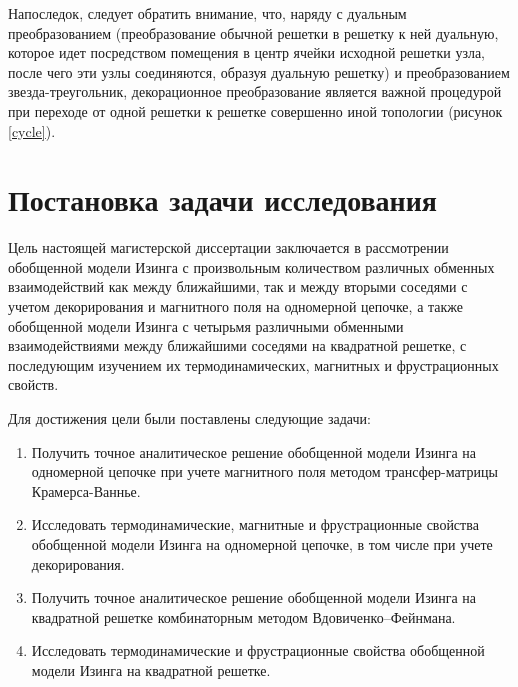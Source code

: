 Напоследок, следует обратить внимание, что, наряду с дуальным преобразованием (преобразование обычной решетки в решетку к ней дуальную, которое идет посредством помещения в центр ячейки исходной решетки узла, после чего эти узлы соединяются, образуя дуальную решетку) и преобразованием \guillemotleft звезда-треугольник\guillemotright \hspace{1pt}, декорационное преобразование является важной процедурой при переходе от одной решетки к решетке совершенно иной топологии (рисунок \ref{cycle}).

\section{Постановка задачи исследования}

Цель настоящей магистерской диссертации заключается в рассмотрении обобщенной модели Изинга с произвольным количеством различных обменных взаимодействий как между ближайшими, так и между вторыми соседями с учетом декорирования и магнитного поля на одномерной цепочке, а также обобщенной модели Изинга с четырьмя различными обменными взаимодействиями между ближайшими соседями на квадратной решетке, с последующим изучением их термодинамических, магнитных и фрустрационных свойств.

Для достижения цели были поставлены следующие задачи:
\begin{enumerate}
    \item Получить точное аналитическое решение обобщенной модели Изинга на одномерной цепочке при учете магнитного поля методом трансфер-матрицы Крамерса-Ваннье.
    \item Исследовать термодинамические, магнитные и фрустрационные свойства обобщенной модели Изинга на одномерной цепочке, в том числе при учете декорирования.
    \item Получить точное аналитическое решение обобщенной модели Изинга на квадратной решетке комбинаторным методом Вдовиченко--Фейнмана.
    \item Исследовать термодинамические и фрустрационные свойства обобщенной модели Изинга на квадратной решетке.
\end{enumerate}

\FloatBarrier
